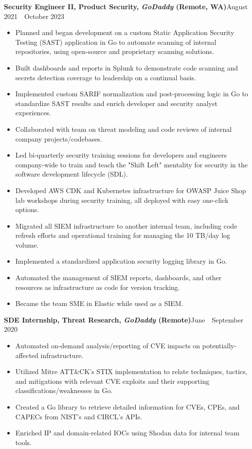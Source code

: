 \documentclass[12pt]{article}
\renewcommand\Large{\fontsize{16.5}{18}}
\newcommand{\sepspacing}{1.25em}
\newcommand{\halfsepspacing}{1em}
\newcommand{\itemspacing}{1pt}
\newcommand{\sep}{
  \vspace{\sepspacing}
}
\newcommand{\resumesection}[1]{
  \sep
  \noindent\Large{\textbf{#1}}\hfill\normalsize
}
\newcommand{\resumelistitem}[1]{
  \item{\fontsize{11.5}{18}#1}
}
\newcommand{\resumejobtitle}[5]{
  \vspace{\halfsepspacing}
  \noindent\normalsize{\textbf{#1, \textit{#2} (#3)}}\hfill\small{#4~\textemdash~#5}
}
\begin{document}
  \pagestyle{resumeheader}

  \resumesection{Professional Experience}

    \resumejobtitle{Security Engineer II, Product Security}{GoDaddy}{Remote, WA}{August 2021}{October 2023}

    \begin{itemize}
      \setlength{\itemsep}{\itemspacing}
      \resumelistitem{Planned and began development on a custom Static Application Security Testing (SAST)
        application in Go to automate scanning of internal repositories,
        using open-source and proprietary scanning solutions.}
      \resumelistitem{Built dashboards and reports in Splunk to demonstrate code scanning and secrets detection
        coverage to leadership on a continual basis.}
      \resumelistitem{Implemented custom SARIF normalization and post-processing logic in Go
        to standardize SAST results and enrich developer and security analyst experiences.}
      \resumelistitem{Collaborated with team on threat modeling and code reviews of internal company projects/codebases.}
      \resumelistitem{Led bi-quarterly security training sessions for developers and engineers company-wide to train and teach
        the "Shift Left" mentality for security in the software development lifecycle (SDL).}
      \resumelistitem{Developed AWS CDK and Kubernetes infrastructure for OWASP Juice Shop lab workshops during security training,
        all deployed with easy one-click options.}
      \resumelistitem{Migrated all SIEM infrastructure to another internal team,
        including code refresh efforts and operational training for managing the 10 TB/day log volume.}
      \resumelistitem{Implemented a standardized application security logging library in Go.}
      \resumelistitem{Automated the management of SIEM reports, dashboards, and other resources as infrastructure as code for version tracking.}
      \resumelistitem{Became the team SME in Elastic while used as a SIEM.}
    \end{itemize}

    \resumejobtitle{SDE Internship, Threat Research}{GoDaddy}{Remote}{June}{September 2020}

    \begin{itemize}
      \setlength{\itemsep}{\itemspacing}
      \resumelistitem{Automated on-demand analysis/reporting of CVE impacts on potentially-affected infrastructure.}
      \resumelistitem{Utilized Mitre ATT\&CK's STIX implementation to relate
        techniques, tactics, and mitigations with relevant CVE
        exploits and their supporting classifications/weaknesses in Go.}
      \resumelistitem{Created a Go library to retrieve detailed information for
        CVEs, CPEs, and CAPECs from NIST's and CIRCL's APIs.}
      \resumelistitem{Enriched IP and domain-related IOCs using Shodan data for internal team tools.}
    \end{itemize}
\end{document}
